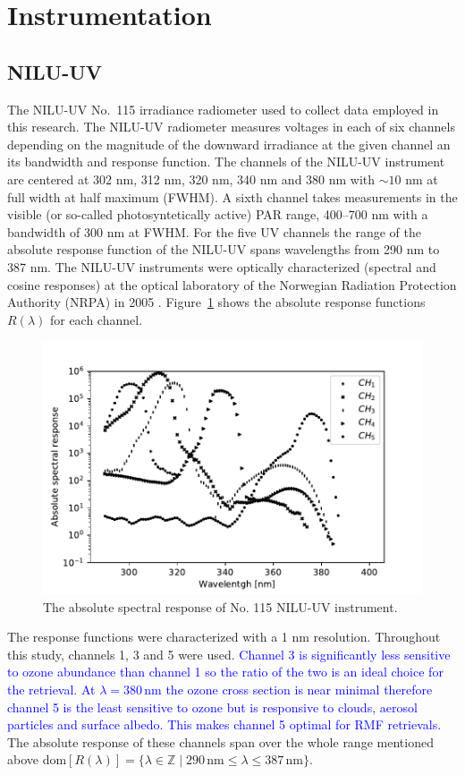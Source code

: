 \documentclass{optica-article}
\begin{document}
\section{Instrumentation}
\label{sec-instruments}

\subsection{NILU-UV}
\label{sec-niluv}

The NILU-UV No.~115 irradiance radiometer used to collect data employed in this research.
The NILU-UV radiometer measures voltages in each of six channels depending on the magnitude of the downward irradiance at the given channel an its bandwidth and response function. 
The channels of the NILU-UV instrument are centered at 302 nm, 312 nm, 320 nm, 340 nm and 380 nm with $\sim 10$ nm at full width at half maximum (FWHM). 
A sixth channel takes measurements in the visible (or so-called photosyntetically active) PAR range, 400--700 nm with a bandwidth of 300 nm at FWHM.
For the five UV channels the range of the absolute response function of the NILU-UV spans wavelengths from 290 nm to 387 nm.
The NILU-UV instruments were optically characterized (spectral and cosine responses) at the optical laboratory of the Norwegian Radiation Protection Authority (NRPA) in 2005 \cite{Aalerud:2006}.
Figure~\ref{fig:absoluteresponse} shows the absolute response functions $R(\lambda)$ for each channel. 

\begin{figure}[H]
	\centering
	\includegraphics[width=0.7\linewidth]{absolute_response}
	\caption{The absolute spectral response of No. 115 NILU-UV instrument.}
	\label{fig:absoluteresponse}
\end{figure}



The response functions were characterized with a 1 nm resolution.
Throughout this study, channels 1, 3 and 5 were used.
\textcolor{blue}{Channel 3 is significantly less sensitive to ozone abundance than channel 1 so the ratio of the two is an ideal choice for the retrieval. 
At $\lambda = 380 \, \text{nm}$ the ozone cross section is near minimal therefore channel 5 is the least sensitive to ozone but is responsive to clouds, aerosol particles and surface albedo. This makes channel 5 optimal for RMF retrievals.} 
The absolute response of these channels span over the whole range mentioned above dom$[R(\lambda)] = \{\lambda \in \mathbb{Z} \mid 290 \, \text{nm} \leq \lambda \leq 387 \, \text{nm} \}$.
\end{document}
